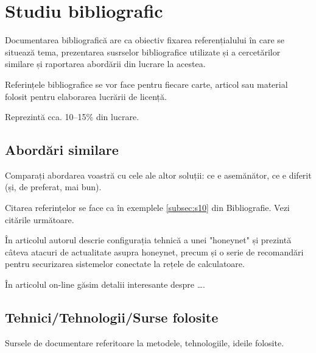 \chapter{Studiu bibliografic}
\label{cap:studiu-bibliografic}

Documentarea bibliografică are ca obiectiv fixarea referențialului în care se situează tema, prezentarea susrselor bibliografice utilizate și a cercetărilor similare și raportarea abordării din lucrare la acestea.

Referințele bibliografice se vor face pentru fiecare carte, articol sau material folosit pentru elaborarea lucrării de licență. 

Reprezintă cca. 10--15\% din lucrare.


\section{Abordări similare}

Comparați abordarea voastră cu cele ale altor soluții: ce e asemănător, ce e diferit (și, de preferat, mai bun). 

Citarea referințelor se face ca în exemplele \ref{subsec:s10} din Bibliografie. 
Vezi citările următoare.

În articolul \cite{Antoniou04} autorul descrie configurația tehnică a unei "honeynet" și prezintă câteva atacuri de actualitate asupra honeynet, precum și o serie de recomandări pentru securizarea sistemelor conectate la rețele de calculatoare.


În articolul on-line \cite{electronic-citation} găsim detalii interesante despre \dots.


\section{Tehnici/Tehnologii/Surse folosite}

Sursele de documentare referitoare la metodele, tehnologiile, ideile folosite. 



